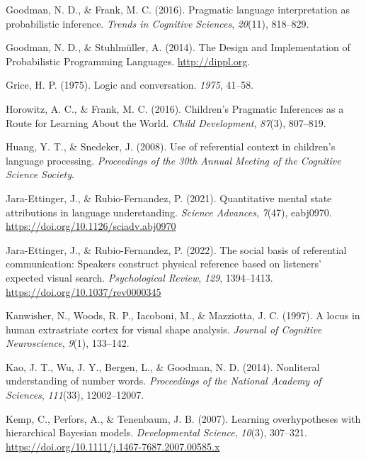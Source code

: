 \documentclass[
  english,
  man,floatsintext]{apa6}
\newlength{\cslhangindent}
\newenvironment{cslreferences}%
  {\setlength{\parindent}{0pt}%
  \everypar{\setlength{\hangindent}{\cslhangindent}}\ignorespaces}%
  {\par}
\begin{document}
\begin{cslreferences}
\leavevmode\hypertarget{ref-goodman2016}{}%
Goodman, N. D., \& Frank, M. C. (2016). Pragmatic language interpretation as probabilistic inference. \emph{Trends in Cognitive Sciences}, \emph{20}(11), 818--829.

\leavevmode\hypertarget{ref-dippl}{}%
Goodman, N. D., \& Stuhlmüller, A. (2014). The Design and Implementation of Probabilistic Programming Languages. \url{http://dippl.org}.

\leavevmode\hypertarget{ref-grice1975logic}{}%
Grice, H. P. (1975). Logic and conversation. \emph{1975}, 41--58.

\leavevmode\hypertarget{ref-horowitz_childrens_2016}{}%
Horowitz, A. C., \& Frank, M. C. (2016). Children's Pragmatic Inferences as a Route for Learning About the World. \emph{Child Development}, \emph{87}(3), 807--819.

\leavevmode\hypertarget{ref-huangsnedeker2008}{}%
Huang, Y. T., \& Snedeker, J. (2008). Use of referential context in children's language processing. \emph{Proceedings of the 30th Annual Meeting of the Cognitive Science Society}.

\leavevmode\hypertarget{ref-jara-ettinger_quantitative_2021}{}%
Jara-Ettinger, J., \& Rubio-Fernandez, P. (2021). Quantitative mental state attributions in language understanding. \emph{Science Advances}, \emph{7}(47), eabj0970. \url{https://doi.org/10.1126/sciadv.abj0970}

\leavevmode\hypertarget{ref-jara-ettinger_social_2022}{}%
Jara-Ettinger, J., \& Rubio-Fernandez, P. (2022). The social basis of referential communication: Speakers construct physical reference based on listeners' expected visual search. \emph{Psychological Review}, \emph{129}, 1394--1413. \url{https://doi.org/10.1037/rev0000345}

\leavevmode\hypertarget{ref-kanwisher}{}%
Kanwisher, N., Woods, R. P., Iacoboni, M., \& Mazziotta, J. C. (1997). A locus in human extrastriate cortex for visual shape analysis. \emph{Journal of Cognitive Neuroscience}, \emph{9}(1), 133--142.

\leavevmode\hypertarget{ref-kao2014}{}%
Kao, J. T., Wu, J. Y., Bergen, L., \& Goodman, N. D. (2014). Nonliteral understanding of number words. \emph{Proceedings of the National Academy of Sciences}, \emph{111}(33), 12002--12007.

\leavevmode\hypertarget{ref-kemp_learning_2007}{}%
Kemp, C., Perfors, A., \& Tenenbaum, J. B. (2007). Learning overhypotheses with hierarchical Bayesian models. \emph{Developmental Science}, \emph{10}(3), 307--321. \url{https://doi.org/10.1111/j.1467-7687.2007.00585.x}


\end{cslreferences}
\end{document}
